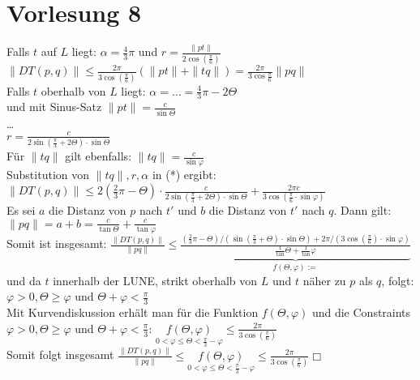 \documentclass{article}
\begin{document}
\begin{enumerate}
	
\end{enumerate}



\section{Vorlesung 8}
Falls $t$ auf $L$ liegt: $\alpha = \frac{4}{3}\pi$ und $\displaystyle r
= \frac{\|pt\|}{2\cos(\frac{\pi}{6})}$ \\
$\displaystyle \|DT(p,q)\| \leq
\frac{2\pi}{3\cos(\frac{\pi}{6})}(\|pt\|+\|tq\|) =
\frac{2\pi}{3\cos\frac{\pi}{6}}\|pq\|$ \\
Falls $t$ oberhalb von $L$ liegt: $\alpha = \ldots = \frac{4}{3}\pi -2
\Theta$ \\ und mit Sinus-Satz $\displaystyle \|pt\| =
\frac{c}{\sin\Theta}$ \\
\ldots \\
$\displaystyle r = \frac{c}{2\sin(\frac{\pi}{3}+2\Theta)\cdot\sin\Theta}$\\
Für $\|tq\|$ gilt ebenfalls: $\displaystyle \|tq\| =
\frac{c}{\sin\varphi}$ \\
Substitution von $\|tq\|, r, \alpha$ in (*) ergibt: $\displaystyle
\|DT(p,q)\| \leq
2(\frac{2}{3}\pi-\Theta)\cdot\frac{c}{2\sin(\frac{\pi}{3}+2\Theta)\cdot\sin\Theta}+\frac{2\pi
	c}{3\cos(\frac{\pi}{6}\cdot\sin\varphi)}$ \\
Es sei $a$ die Distanz von $p$ nach $t'$ und $b$ die Distanz von $t'$
nach $q$. Dann gilt: $\displaystyle \|pq\| = a+b = \frac{c}{\tan\Theta}
+ \frac{c}{\tan\varphi}$ \\
Somit ist insgesamt: $\displaystyle \frac{\|DT(p,q)\|}{\|pq\|} \leq
\underbrace{\frac{(\frac{2}{3}\pi-\Theta)/(\sin(\frac{\pi}{3}+\Theta)\cdot\sin\Theta)+2\pi/(3\cos(\frac{\pi}{6})\cdot\sin\varphi)}{\frac{1}{\tan}\Theta+\frac{1}{\tan}\varphi}}_{f(\Theta,\varphi):=}$
\\
und da $t$ innerhalb der LUNE, strikt oberhalb von $L$ und $t$ näher zu
$p$ als $q$, folgt: $\varphi > 0, \Theta \geq \varphi$ und
$\displaystyle \Theta+\varphi < \frac{\pi}{3}$ \\
Mit Kurvendiskussion erhält man für die Funktion $f(\Theta,\varphi)$ und
die Constraints $\varphi > 0, \Theta \geq \varphi$ und $\displaystyle
\Theta+\varphi < \frac{\pi}{3}$: $\displaystyle
\underset{0<\varphi\leq\Theta<\frac{\pi}{3}-\varphi}{f(\Theta,\varphi)}
\leq \frac{2\pi}{3\cos(\frac{\pi}{6})}$ \\
Somit folgt insgesamt $\displaystyle \frac{\|DT(p,q)\|}{\|pq\|} \leq
\underset{0<\varphi\leq\Theta<\frac{\pi}{3}-\varphi}{f(\Theta,\varphi)}
\leq \frac{2\pi}{3\cos(\frac{\pi}{6})}\Box$ \\
\end{document}
